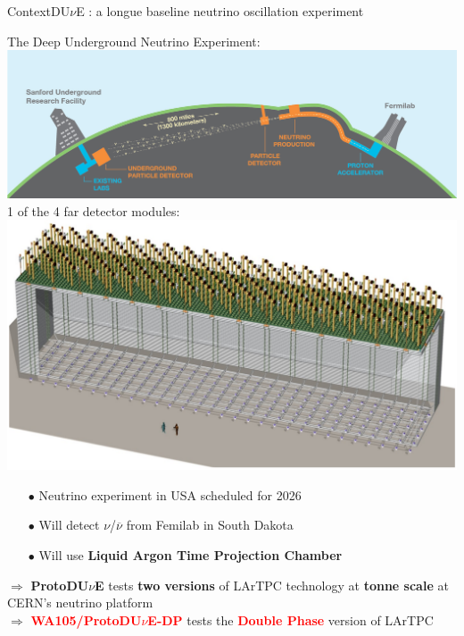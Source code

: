 \documentclass[10pt]{beamer}
\begin{document}
    \begin{frame}{Context}{DU$\nu$E : a longue baseline neutrino oscillation experiment}
    	\begin{scriptsize}
    	\begin{minipage}{0.58\textwidth}
    		The Deep Underground Neutrino Experiment:\\
    		\includegraphics[width=\textwidth]{figures/contexte/dune.jpg}\\
    		
    		1 of the 4 far detector modules:\\
    		\includegraphics[width=\textwidth]{figures/contexte/dune_module.png}\\
    	\end{minipage}
    	\hfill
    	\begin{minipage}{0.38\textwidth}
    		\begin{itemize}
    			\item[$\bullet$] Neutrino experiment in USA scheduled for 2026
    			\item[$\bullet$] Will detect $\nu$/$\overline{\nu}$ from Femilab in South Dakota
    			\item[$\bullet$] Will use \textbf{Liquid Argon Time Projection Chamber}
    		\end{itemize}
    		\vspace{.3cm}
    		$\Rightarrow$ \textbf{ProtoDU$\nu$E} tests \textbf{two versions} of LArTPC technology at \textbf{tonne scale} at CERN's neutrino platform\\
    		
    		$\Rightarrow$ \textcolor{red}{\textbf{WA105/ProtoDU$\nu$E-DP}} tests the \textcolor{red}{\textbf{Double Phase}} version of LArTPC 
	    \end{minipage}
	\end{scriptsize}
    \end{frame}
    
\end{document}

